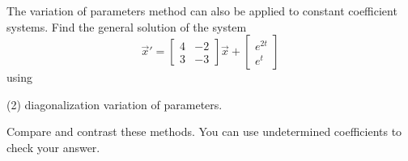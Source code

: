 \documentclass{ximera}
\begin{document}
\begin{exercise}
    The variation of parameters method can also be applied to constant coefficient systems. Find the general solution of the system
    \[ {\vec{x}}' = \begin{bmatrix} 4 & -2 \\ 3 & -3 \end{bmatrix} \vec{x} + \begin{bmatrix} e^{2t} \\ e^t \end{bmatrix} \] using 
    \begin{tasks}(2)
        \task diagonalization
        \task variation of parameters.
    \end{tasks}
    Compare and contrast these methods. You can use undetermined coefficients to check your answer.
\end{exercise}
\end{document}
